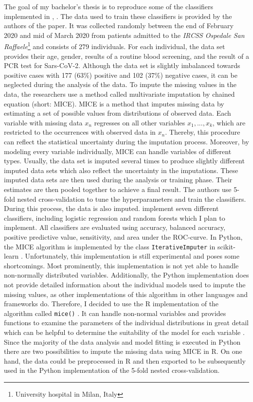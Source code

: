 \documentclass[12pt,a4paper,oneside]{article}
\newcommand{\code}{\texttt}
\begin{document}
The goal of my bachelor's thesis is to reproduce some of the classifiers implemented in \citeauthor{RN127}, \citeyear{RN127} \cite{RN127}. The data used to train these classifiers is provided by the authors of the paper. It was collected randomly between the end of February 2020 and mid of March 2020 from patients admitted to the \textit{IRCSS Ospedale San Raffaele}\footnote{University hospital in Milan, Italy} and consists of 279 individuals. For each individual, the data set provides their age, gender, results of a routine blood screening, and the result of a PCR test for Sars-CoV-2. Although the data set is slightly imbalanced towards positive cases with 177 (63\%) positive and 102 (37\%) negative cases, it can be neglected during the analysis of the data. To impute the missing values in the data, the researchers use a method called multivariate imputation by chained equation (short: MICE). MICE is a method that imputes missing data by estimating a set of possible values from distributions of observed data. Each variable with missing data $x_n$ regresses on all other variables $x_1, ..., x_k$, which are restricted to the occurrences with observed data in $x_n$. Thereby, this procedure can reflect the statistical uncertainty during the imputation process. Moreover, by modeling every variable individually, MICE can handle variables of different types. Usually, the data set is imputed several times to produce slightly different imputed data sets which also reflect the uncertainty in the imputations. These imputed data sets are then used during the analysis or training phase. Their estimates are then pooled together to achieve a final result. \cite{RN141,RN142, RN144} The authors use 5-fold nested cross-validation to tune the hyperparameters and train the classifiers. During this process, the data is also imputed. \citeauthor{RN127} implement seven different classifiers, including logistic regression and random forests which I plan to implement. All classifiers are evaluated using accuracy, balanced accuracy, positive predictive value, sensitivity, and area under the ROC-curve.
In Python, the MICE algorithm is implemented by the class \code{IterativeImputer} in scikit-learn \cite{scikit-learn}. Unfortunately, this implementation is still experimental and poses some shortcomings. Most prominently, this implementation is not yet able to handle non-normally distributed variables. Additionally, the Python implementation does not provide detailed information about the individual models used to impute the missing values, as other implementations of this algorithm in other languages and frameworks do. Therefore, I decided to use the R implementation of the algorithm called \code{mice()} \cite{RN135}. It can handle non-normal variables and provides functions to examine the parameters of the individual distributions in great detail which can be helpful to determine the suitability of the model for each variable \cite{RN142}. Since the majority of the data analysis and model fitting is executed in Python there are two possibilities to impute the missing data using MICE in R. On one hand, the data could be preprocessed in R and then exported to be subsequently used in the Python implementation of the 5-fold nested cross-validation. 
\end{document}
